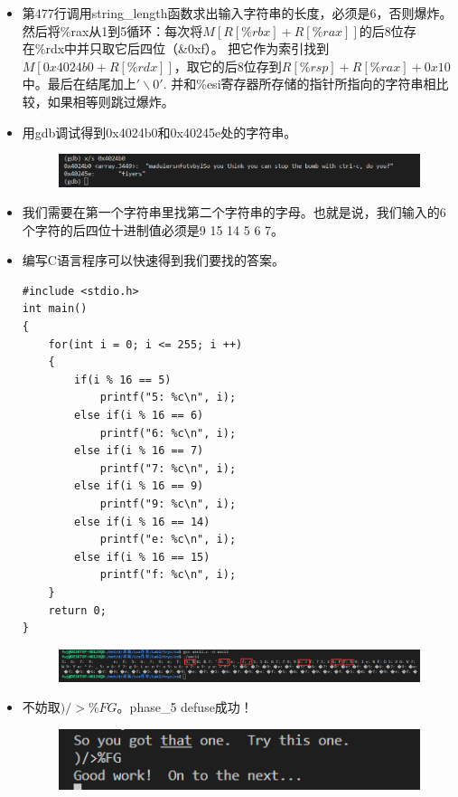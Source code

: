 \documentclass[12pt, a4paper, oneside]{ctexart}
\begin{document}
\begin{itemize}
    \item 第477行调用string\_length函数求出输入字符串的长度，必须是6，否则爆炸。
    然后将\%rax从1到5循环：每次将$M[R[\%rbx] + R[\%rax]]$的后8位存在\%rdx中并只取它后四位（\&0xf）。
    把它作为索引找到$M[0x4024b0 + R[\%rdx]]$，取它的后8位存到$R[\%rsp] + R[\%rax] + 0x10$中。最后在结尾加上$'\backslash0'$.
    并和\%esi寄存器所存储的指针所指向的字符串相比较，如果相等则跳过爆炸。
    \item 用gdb调试得到0x4024b0和0x40245e处的字符串。
    \begin{figure}[htbp]
        \includegraphics[scale=0.6]{image/2.6-2.png}
    \end{figure}    
    \item 我们需要在第一个字符串里找第二个字符串的字母。也就是说，我们输入的6个字符的后四位十进制值必须是9 15 14 5 6 7。
    \item 编写C语言程序可以快速得到我们要找的答案。
\begin{lstlisting}
#include <stdio.h>
int main()
{
    for(int i = 0; i <= 255; i ++)
    {
        if(i % 16 == 5)
            printf("5: %c\n", i);
        else if(i % 16 == 6)
            printf("6: %c\n", i);
        else if(i % 16 == 7)
            printf("7: %c\n", i);
        else if(i % 16 == 9)
            printf("9: %c\n", i);
        else if(i % 16 == 14)
            printf("e: %c\n", i);
        else if(i % 16 == 15)
            printf("f: %c\n", i);
    }
    return 0;
}    
\end{lstlisting}
\begin{figure}[htbp]
    \includegraphics[scale=0.45]{image/2.6-3.png}
\end{figure}
    \item 不妨取$)/>\%FG$。phase\_5 defuse成功！
\begin{figure}[htbp]
    \includegraphics[scale=0.7]{image/2.6-4.png}
\end{figure}
\end{itemize}
\end{document}
